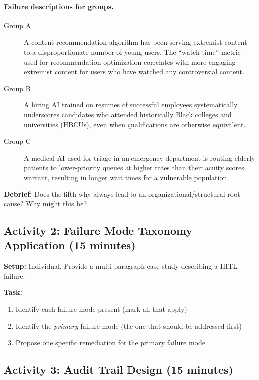 \paragraph{Failure descriptions for groups.}

\begin{description}
    \item[Group A] A content recommendation algorithm has been serving extremist content to a disproportionate number of young users. The ``watch time'' metric used for recommendation optimization correlates with more engaging extremist content for users who have watched any controversial content.

    \item[Group B] A hiring AI trained on resumes of successful employees systematically underscores candidates who attended historically Black colleges and universities (HBCUs), even when qualifications are otherwise equivalent.

    \item[Group C] A medical AI used for triage in an emergency department is routing elderly patients to lower-priority queues at higher rates than their acuity scores warrant, resulting in longer wait times for a vulnerable population.
\end{description}

\textbf{Debrief:} Does the fifth why always lead to an organizational/structural root cause? Why might this be?

\subsection{Activity 2: Failure Mode Taxonomy Application (15 minutes)}

\textbf{Setup:} Individual. Provide a multi-paragraph case study describing a HITL failure.

\textbf{Task:}
\begin{enumerate}
    \item Identify each failure mode present (mark all that apply)
    \item Identify the \emph{primary} failure mode (the one that should be addressed first)
    \item Propose one specific remediation for the primary failure mode
\end{enumerate}

\subsection{Activity 3: Audit Trail Design (15 minutes)}

